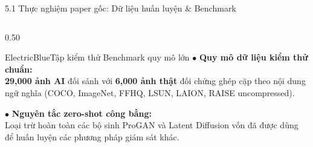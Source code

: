 \documentclass[aspectratio=169, 10pt, t]{beamer}
\begin{document}
\begin{frame}{5.1 Thực nghiệm paper gốc: Dữ liệu huấn luyện \& Benchmark}
\begin{columns}[t, totalwidth=\linewidth]
\begin{column}{0.50\linewidth}
\begin{accentbox}[equal height group=origexp, top=0.8mm, bottom=0.8mm]{ElectricBlue}{Tập kiểm thử Benchmark quy mô lớn}
        $\bullet$ \textbf{Quy mô dữ liệu kiểm thử chuẩn:}\\
        \textbf{29,000 ảnh AI} đối sánh với \textbf{6,000 ảnh thật} đối chứng ghép cặp theo nội dung ngữ nghĩa (COCO, ImageNet, FFHQ, LSUN, LAION, RAISE uncompressed).
        \vspace{0.18em}

        $\bullet$ \textbf{Nguyên tắc zero-shot công bằng:}\\
        Loại trừ hoàn toàn các bộ sinh ProGAN và Latent Diffusion vốn đã được dùng để huấn luyện các phương pháp giám sát khác.
      \end{accentbox}
    \end{column}
  \end{columns}
\end{frame}
\end{document}
